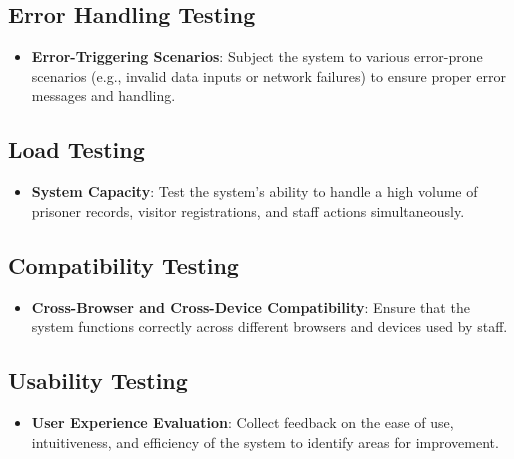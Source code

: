 \subsection{Error Handling Testing}
\begin{itemize}
    \item \textbf{Error-Triggering Scenarios}: Subject the system to various error-prone scenarios (e.g., invalid data inputs or network failures) to ensure proper error messages and handling.
\end{itemize}

\subsection{Load Testing}
\begin{itemize}
    \item \textbf{System Capacity}: Test the system's ability to handle a high volume of prisoner records, visitor registrations, and staff actions simultaneously.
\end{itemize}

\subsection{Compatibility Testing}
\begin{itemize}
    \item \textbf{Cross-Browser and Cross-Device Compatibility}: Ensure that the system functions correctly across different browsers and devices used by staff.
\end{itemize}

\subsection{Usability Testing}
\begin{itemize}
    \item \textbf{User Experience Evaluation}: Collect feedback on the ease of use, intuitiveness, and efficiency of the system to identify areas for improvement.
\end{itemize}
